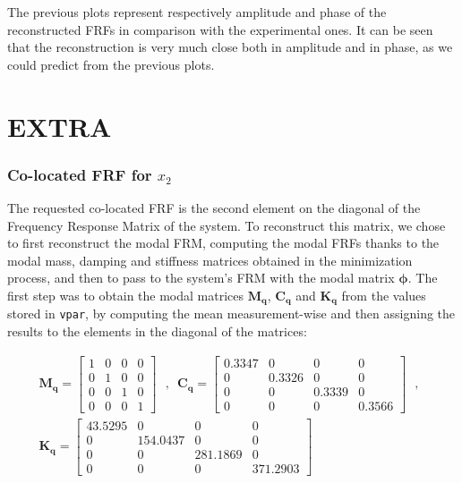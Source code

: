 \documentclass[a4paper,12pt,oneside]{article}
\begin{document}
The previous plots represent respectively amplitude and phase of the reconstructed FRFs in comparison with the experimental ones.
It can be seen that the reconstruction is very much close both in amplitude and in phase, as we could predict from the previous plots.


\part*{EXTRA}

\section{Co-located FRF for $ x_2 $}

The requested co-located FRF is the second element on the diagonal of the Frequency Response Matrix of the system. To reconstruct this matrix, we chose to first reconstruct the modal FRM, computing the modal FRFs thanks to the modal mass, damping and stiffness matrices obtained in the minimization process, and then to pass to the system's FRM with the modal matrix $ \bm{\phi} $. The first step was to obtain the modal matrices $ \mathbf{M_q} $, $ \mathbf{C_q} $ and $ \mathbf{K_q} $ from the values stored in \lstinline!vpar!, by computing the mean measurement-wise and then assigning the results to the elements in the diagonal of the matrices:

\[ \begin{split}
	\mathbf{M_q} =	\begin{bmatrix}
										1	& 0	& 0	& 0 \\
										0	& 1	& 0	& 0 \\
										0	& 0	& 1	& 0 \\
										0	& 0	& 0	& 1
									\end{bmatrix} \text{~ , ~}
		\mathbf{C_q} =	\begin{bmatrix}
											0.3347	& 0				& 0				& 0 \\
											0				& 0.3326	& 0				& 0 \\
											0				& 0				& 0.3339	& 0 \\
											0				& 0				& 0				& 0.3566
										\end{bmatrix} \text{~ , ~} \\[10pt]
	\mathbf{K_q} =	\begin{bmatrix}
										43.5295	& 0					& 0					& 0 \\
										0				& 154.0437	& 0					& 0 \\
										0				& 0					& 281.1869	& 0 \\
										0				& 0					& 0					& 371.2903
									\end{bmatrix}
\end{split} \]
\end{document}
